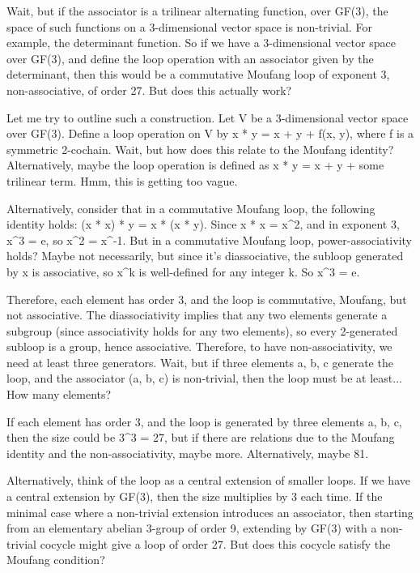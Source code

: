\documentclass[12p]{article}
\newcounter{reasoningcounter}
\newenvironment{reasoning}[1][]
{\refstepcounter{reasoningcounter}%
\begin{tcolorbox}[
    title=Reasoning \thereasoningcounter: #1,
    colback=white, %
    colframe=gray,
    coltext=black, %
    fonttitle=\bfseries\normalsize,
    top=2mm,
    bottom=2mm,
    enlarge top initially by=5mm
]
\small
}
{\end{tcolorbox}}
\begin{document}
\begin{reasoning}
Wait, but if the associator is a trilinear alternating function, over GF(3), the space of such functions on a 3-dimensional vector space is non-trivial. For example, the determinant function. So if we have a 3-dimensional vector space over GF(3), and define the loop operation with an associator given by the determinant, then this would be a commutative Moufang loop of exponent 3, non-associative, of order 27. But does this actually work?

Let me try to outline such a construction. Let V be a 3-dimensional vector space over GF(3). Define a loop operation on V by x * y = x + y + f(x, y), where f is a symmetric 2-cochain. Wait, but how does this relate to the Moufang identity? Alternatively, maybe the loop operation is defined as x * y = x + y + some trilinear term. Hmm, this is getting too vague.

Alternatively, consider that in a commutative Moufang loop, the following identity holds: (x * x) * y = x * (x * y). Since x * x = x^2, and in exponent 3, x^3 = e, so x^2 = x^{-1}. But in a commutative Moufang loop, power-associativity holds? Maybe not necessarily, but since it's diassociative, the subloop generated by x is associative, so x^k is well-defined for any integer k. So x^3 = e.

Therefore, each element has order 3, and the loop is commutative, Moufang, but not associative. The diassociativity implies that any two elements generate a subgroup (since associativity holds for any two elements), so every 2-generated subloop is a group, hence associative. Therefore, to have non-associativity, we need at least three generators. Wait, but if three elements a, b, c generate the loop, and the associator (a, b, c) is non-trivial, then the loop must be at least... How many elements?

If each element has order 3, and the loop is generated by three elements a, b, c, then the size could be 3^3 = 27, but if there are relations due to the Moufang identity and the non-associativity, maybe more. Alternatively, maybe 81.

Alternatively, think of the loop as a central extension of smaller loops. If we have a central extension by GF(3), then the size multiplies by 3 each time. If the minimal case where a non-trivial extension introduces an associator, then starting from an elementary abelian 3-group of order 9, extending by GF(3) with a non-trivial cocycle might give a loop of order 27. But does this cocycle satisfy the Moufang condition?


\end{reasoning}
\end{document}
